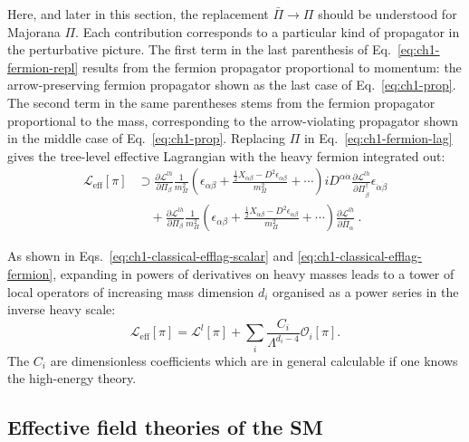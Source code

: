 Here, and later in this section, the replacement $\bar{\Pi} \to \Pi$ should be
understood for Majorana $\Pi$. Each contribution corresponds to a particular
kind of propagator in the perturbative picture. The first term in the last
parenthesis of Eq.~\eqref{eq:ch1-fermion-repl} results from the fermion propagator
proportional to momentum: the arrow-preserving fermion propagator shown as the
last case of Eq.~\eqref{eq:ch1-prop}. The second term in the same parentheses stems
from the fermion propagator proportional to the mass, corresponding to the
arrow-violating propagator shown in the middle case of Eq.~\eqref{eq:ch1-prop}.
Replacing $\Pi$ in Eq.~\eqref{eq:ch1-fermion-lag} gives the tree-level effective
Lagrangian with the heavy fermion integrated out:
\begin{equation}
  \begin{aligned}
    \label{eq:ch1-classical-efflag-fermion}
    \mathscr{L}_{\text{eff}}[\pi] &\supset \frac{\partial \mathscr{L}^{lh}}{\partial \Pi_{\beta}} \frac{1}{m_{\Pi}^{2}} \left(\epsilon_{\alpha \beta} + \frac{ \tfrac{1}{2} X_{\alpha \beta} - D^{2} \epsilon_{\alpha \beta}}{m_{\Pi}^{2}} +  \cdots \right) i D^{\alpha \dot{\alpha}} \frac{\partial \mathscr{L}^{lh}}{\partial \Pi^{\dagger}_{\dot{\beta}}} \epsilon_{\dot{\alpha} \dot{\beta}}\\
    &\quad + \frac{\partial \mathscr{L}^{lh}}{\partial \Pi_{\beta}} \frac{1}{m_{\Pi}^{2}} \left(\epsilon_{\alpha \beta} + \frac{ \tfrac{1}{2} X_{\alpha \beta} - D^{2} \epsilon_{\alpha \beta}}{m_{\Pi}^{2}} + \cdots \right) \frac{\partial \mathscr{L}^{lh}}{\partial \bar{\Pi}_{\alpha}} \ .
  \end{aligned}
\end{equation}

As shown in Eqs.~\eqref{eq:ch1-classical-efflag-scalar} and
\eqref{eq:ch1-classical-efflag-fermion}, expanding in powers of derivatives on heavy
masses leads to a tower of local operators of increasing mass dimension $d_{i}$
organised as a power series in the inverse heavy scale:
\begin{equation}
  \mathscr{L}_{\text{eff}}[\pi] = \mathscr{L}^{l}[\pi] + \sum_{i} \frac{C_{i}}{\Lambda^{d_{i}-4}} \mathcal{O}_{i}[\pi].
\end{equation}
The $C_{i}$ are dimensionless coefficients which are in general calculable if
one knows the high-energy theory.

\subsection{Effective field theories of the SM}
\label{sec:ch1-EFT-of-SM}

